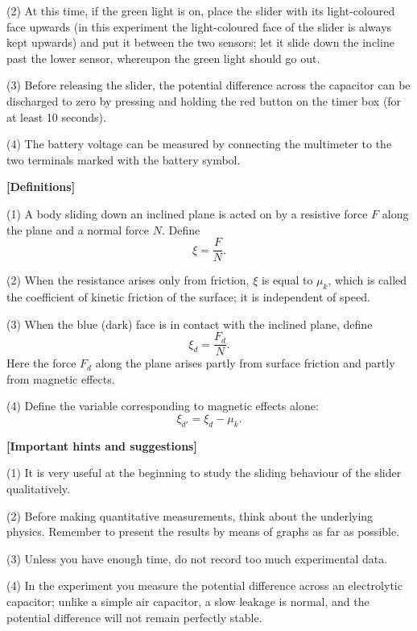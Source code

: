 (2) At this time, if the green light is on, place the slider with its light-coloured face upwards (in this experiment the light-coloured face of the slider is always kept upwards) and put it between the two sensors; let it slide down the incline past the lower sensor, whereupon the green light should go out.

(3) Before releasing the slider, the potential difference across the capacitor can be discharged to zero by pressing and holding the red button on the timer box (for at least 10 seconds).

(4) The battery voltage can be measured by connecting the multimeter to the two terminals marked with the battery symbol.

\textbf{[Definitions]}

(1) A body sliding down an inclined plane is acted on by a resistive force $F$ along the plane and a normal force $N$. Define
\begin{equation*}
\xi=\frac{F}{N} .
\end{equation*}

(2) When the resistance arises only from friction, $\xi$ is equal to $\mu_k$, which is called the coefficient of kinetic friction of the surface; it is independent of speed.

(3) When the blue (dark) face is in contact with the inclined plane, define
\begin{equation*}
\xi_d=\frac{F_d}{N} .
\end{equation*}
Here the force $F_d$ along the plane arises partly from surface friction and partly from magnetic effects.

(4) Define the variable corresponding to magnetic effects alone:
\begin{equation*}
\xi_{d'}=\xi_d-\mu_k .
\end{equation*}

\textbf{[Important hints and suggestions]}

(1) It is very useful at the beginning to study the sliding behaviour of the slider qualitatively.

(2) Before making quantitative measurements, think about the underlying physics. Remember to present the results by means of graphs as far as possible.

(3) Unless you have enough time, do not record too much experimental data.

(4) In the experiment you measure the potential difference across an electrolytic capacitor; unlike a simple air capacitor, a slow leakage is normal, and the potential difference will not remain perfectly stable.

